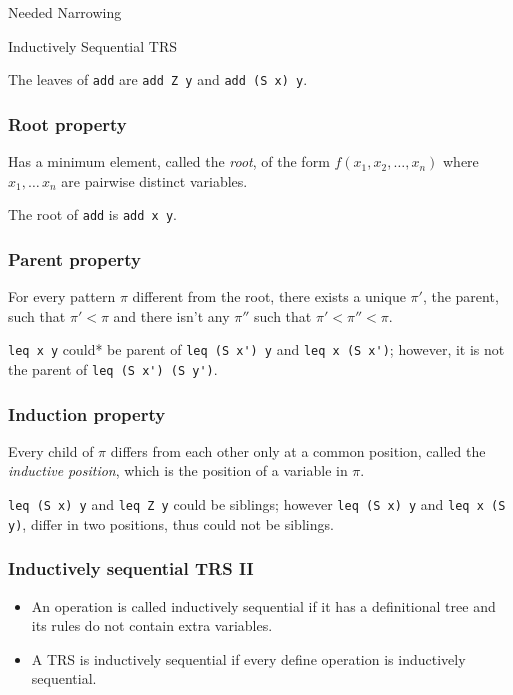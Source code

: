 \documentclass{beamer}
\begin{document}
\begin{section}{Needed Narrowing}
\begin{subsection}{Inductively Sequential TRS}
\begin{frame}
\begin{example}
  The leaves of \verb|add| are \verb|add Z y| and \verb|add (S x) y|.
\end{example}
\end{frame}
\begin{frame}
[fragile]
\frametitle{Root property}
Has a minimum element, called the \textit{root}, of the form $f(x_1,x_2,\ldots,x_n)$ where $x_1,\ldots\,x_n$ are pairwise distinct variables.

\begin{example}
The root of \verb|add| is \verb|add x y|.

\end{example}
\end{frame}
\begin{frame}
[fragile]
  \frametitle{Parent property} For every pattern $\pi$ different from the root, there exists a unique $\pi'$, the parent, such that $\pi' < \pi$ and there isn't any $\pi''$ such that $\pi' < \pi'' < \pi$.

\begin{example}
  \verb|leq x y| could* be parent of \verb|leq (S x') y| and \verb|leq x (S x')|; however, it is not the parent of \verb|leq (S x') (S y')|.
\end{example}
\end{frame}
\begin{frame}
[fragile]
\frametitle{Induction property} Every child of $\pi$ differs from each other only at a common position, called the \textit{inductive position}, which is the position of a variable in $\pi$.

\begin{example}
\verb|leq (S x) y| and \verb|leq Z y| could be siblings; however \verb|leq (S x) y| and \verb|leq x (S y)|, differ in two positions, thus could not be siblings.
\end{example}

\end{frame}
\begin{frame}
\frametitle{Inductively sequential TRS II}
\begin{itemize}
\item An operation is called inductively sequential if it has a definitional tree and its rules do not contain extra variables.
\item A TRS is inductively sequential if every define operation is inductively sequential. 
\end{itemize}
\end{frame}


\end{subsection}
\end{section}
\end{document}
